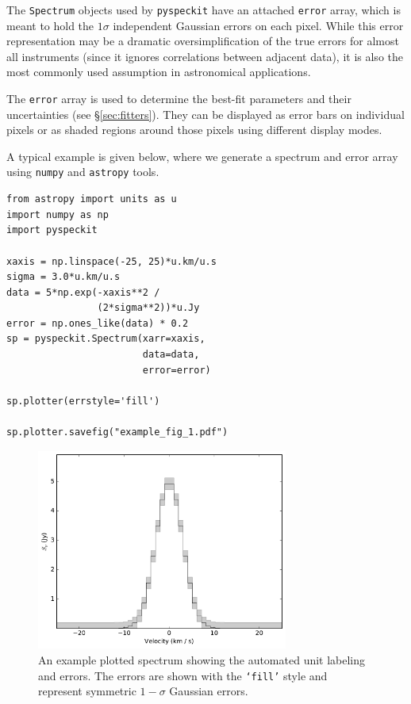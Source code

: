 \documentclass[twocolumn]{aastex62}
\newcommand{\pyspeckit}{\texttt{pyspeckit}\xspace}
\begin{document}


The \texttt{Spectrum} objects used by \pyspeckit have an attached \texttt{error}
array, which is meant to hold the $1\sigma$ independent Gaussian errors on
each pixel.  While this error representation may be a dramatic
oversimplification of the true errors for almost all instruments (since it ignores correlations between adjacent data), it is also the most
commonly used assumption in astronomical applications.

The \texttt{error} array is used to determine the best-fit parameters and their uncertainties (see
\S \ref{sec:fitters}).  They can be displayed as error bars on individual
pixels or as shaded regions around those pixels using different display modes.

A typical example is given below, where we generate a spectrum and error
array using \texttt{numpy} and \texttt{astropy} tools.

\vspace{2mm}
\begin{minipage}{\linewidth}
\begin{verbatim}
from astropy import units as u
import numpy as np
import pyspeckit

xaxis = np.linspace(-25, 25)*u.km/u.s
sigma = 3.0*u.km/u.s
data = 5*np.exp(-xaxis**2 /
                (2*sigma**2))*u.Jy
error = np.ones_like(data) * 0.2
sp = pyspeckit.Spectrum(xarr=xaxis,
                        data=data,
                        error=error)

sp.plotter(errstyle='fill')

sp.plotter.savefig("example_fig_1.pdf")
\end{verbatim}
\end{minipage}

\begin{figure}[!htp]
\includegraphics[scale=1,width=3.25in]{example_fig_1.pdf}
\caption{An example plotted spectrum showing the automated unit labeling
and errors.  The errors are shown with the \texttt{`fill'} style
and represent symmetric $1-\sigma$ Gaussian errors.  }
\label{fig:example1}
\end{figure}
\end{document}

